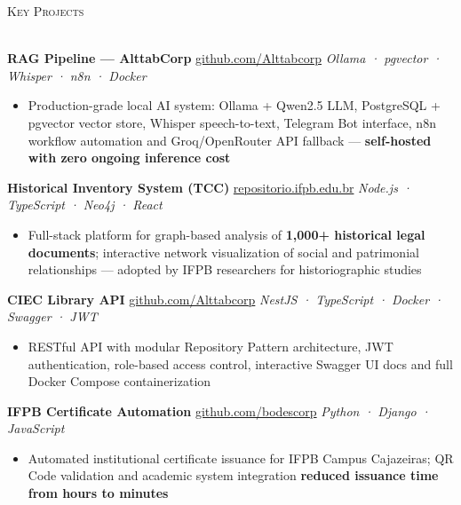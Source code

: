 \documentclass[a4paper]{article}
\newcommand{\lineunder}{
    \vspace*{-8pt} \\
    \hspace*{-18pt} \hrulefill \\
}
\newcommand{\header}[1]{
    {\hspace*{-18pt}\vspace*{6pt} \textsc{#1}}
    \vspace*{-6pt} \lineunder
}
\begin{document}
\vspace{3mm}

\header{Key Projects}
\vspace{2mm}

\textbf{RAG Pipeline — AlttabCorp}
\hfill {\small \href{https://github.com/Alttabcorp}{github.com/Alttabcorp}}
\hfill {\sl Ollama · pgvector · Whisper · n8n · Docker}\\
\vspace{-3mm}
\begin{itemize}[leftmargin=*, itemsep=-2pt]
    \item Production-grade local AI system: Ollama + Qwen2.5 LLM, PostgreSQL + pgvector vector store, Whisper speech-to-text, Telegram Bot interface, n8n workflow automation and Groq/OpenRouter API fallback — \textbf{self-hosted with zero ongoing inference cost}
\end{itemize}
\vspace{2mm}

\textbf{Historical Inventory System (TCC)}
\hfill {\small \href{https://repositorio.ifpb.edu.br/handle/177683/2898}{repositorio.ifpb.edu.br}}
\hfill {\sl Node.js · TypeScript · Neo4j · React}\\
\vspace{-3mm}
\begin{itemize}[leftmargin=*, itemsep=-2pt]
    \item Full-stack platform for graph-based analysis of \textbf{1,000+ historical legal documents}; interactive network visualization of social and patrimonial relationships — adopted by IFPB researchers for historiographic studies
\end{itemize}
\vspace{2mm}

\textbf{CIEC Library API}
\hfill {\small \href{https://github.com/Alttabcorp/API-bibliteca_siec}{github.com/Alttabcorp}}
\hfill {\sl NestJS · TypeScript · Docker · Swagger · JWT}\\
\vspace{-3mm}
\begin{itemize}[leftmargin=*, itemsep=-2pt]
    \item RESTful API with modular Repository Pattern architecture, JWT authentication, role-based access control, interactive Swagger UI docs and full Docker Compose containerization
\end{itemize}
\vspace{2mm}

\textbf{IFPB Certificate Automation}
\hfill {\small \href{https://github.com/bodescorp/Cext-final-}{github.com/bodescorp}}
\hfill {\sl Python · Django · JavaScript}\\
\vspace{-3mm}
\begin{itemize}[leftmargin=*, itemsep=-2pt]
    \item Automated institutional certificate issuance for IFPB Campus Cajazeiras; QR Code validation and academic system integration \textbf{reduced issuance time from hours to minutes}
\end{itemize}
\end{document}
